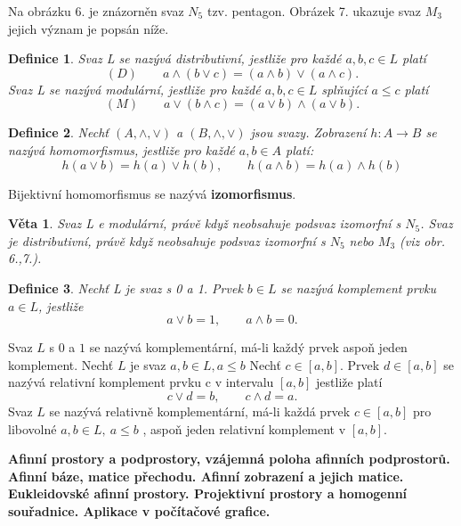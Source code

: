 \documentclass[12pt,a4paper]{article}
\newtheorem{definition}{Definice}
\newtheorem{sentence}{Věta}
\begin{document}
Na obrázku 6. je znázorněn svaz $N_5$ tzv. pentagon. Obrázek 7. ukazuje svaz $M_3$ jejich význam je popsán níže.

\begin{definition}
	Svaz L se nazývá distributivní, jestliže pro každé $a,b,c \in L$ platí $$(D)\qquad a \wedge (b \vee c) = (a \wedge b) \vee (a \wedge c).$$
	Svaz L se nazývá modulární, jestliže pro každé $a,b,c \in L$ splňující $a \leq c$ platí $$(M) \qquad a \vee (b \wedge c) = (a \vee b) \wedge (a \vee b).$$
\end{definition}

\begin{definition}
	Nechť $(A, \wedge, \vee)$ a $(B, \wedge, \vee)$ jsou svazy. Zobrazení $h: A \rightarrow B$ se nazývá homomorfismus, jestliže pro každé $a,b \in A$ platí: $$h(a \vee b) = h(a) \vee h(b), \qquad h(a \wedge b) = h(a) \wedge h(b)$$
\end{definition}
Bijektivní homomorfismus se nazývá \textbf{izomorfismus}.

\begin{sentence}
	Svaz L e modulární, právě když neobsahuje podsvaz izomorfní s $N_5$. Svaz je distributivní, právě když neobsahuje podsvaz izomorfní s $N_5$ nebo $M_3$ (viz obr. 6.,7.).  
\end{sentence}

\begin{definition}
	Nechť L je svaz s 0 a 1. Prvek $b \in L$ se nazývá komplement prvku $a \in L$, jestliže $$a \vee b = 1, \qquad a \wedge b = 0.$$
\end{definition}
Svaz $L$ s $0$ a $1$ se nazývá komplementární, má-li každý prvek aspoň jeden komplement.
Nechť $L$ je svaz $a,b \in L, a \leq b$ Nechť $c \in [a,b]$. Prvek $d \in [a,b]$ se nazývá relativní komplement prvku c v intervalu $[a, b]$ jestliže platí $$c \vee d = b, \qquad c \wedge d = a.$$
Svaz $L$ se nazývá relativně komplementární, má-li každá prvek $c \in [a,b]$ pro libovolné $a,b \in L,\ a \leq b$ , aspoň jeden relativní komplement v $[a,b]$.%

\newpage
\textbf{Afinní prostory a podprostory, vzájemná poloha afinních podprostorů. Afinní báze, matice přechodu. Afinní
zobrazení a jejich matice. Eukleidovské afinní prostory. Projektivní prostory a homogenní souřadnice. Aplikace
v počítačové grafice.}
\end{document}
